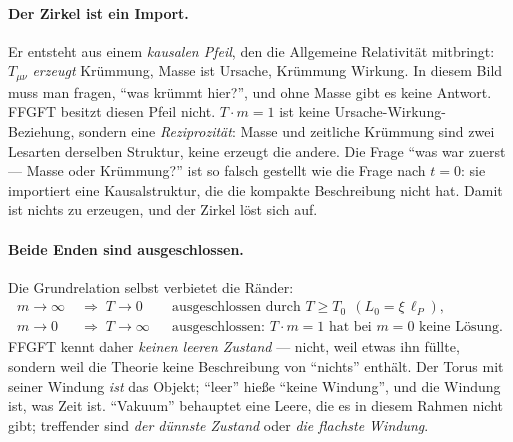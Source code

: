 \paragraph{Der Zirkel ist ein Import.} Er entsteht aus einem \emph{kausalen Pfeil}, den die
Allgemeine Relativität mitbringt: $T_{\mu\nu}$ \emph{erzeugt} Krümmung, Masse ist Ursache,
Krümmung Wirkung. In diesem Bild muss man fragen, \enquote{was krümmt hier?}, und ohne Masse gibt
es keine Antwort. FFGFT besitzt diesen Pfeil nicht. $T\cdot m = 1$ ist keine Ursache-Wirkung-
Beziehung, sondern eine \emph{Reziprozität}: Masse und zeitliche Krümmung sind zwei Lesarten
derselben Struktur, keine erzeugt die andere. Die Frage \enquote{was war zuerst --- Masse oder
Krümmung?} ist so falsch gestellt wie die Frage nach $t=0$: sie importiert eine Kausalstruktur,
die die kompakte Beschreibung nicht hat. Damit ist nichts zu erzeugen, und der Zirkel löst sich
auf.

\paragraph{Beide Enden sind ausgeschlossen.} Die Grundrelation selbst verbietet die Ränder:
\begin{align}
m \to \infty \;&\Rightarrow\; T \to 0 && \text{ausgeschlossen durch } T \ge T_0 \ \ (L_0 = \xi\,\ell_P),\\
m \to 0 \;&\Rightarrow\; T \to \infty && \text{ausgeschlossen: } T\cdot m = 1 \text{ hat bei } m=0 \text{ keine Lösung.}
\end{align}
FFGFT kennt daher \emph{keinen leeren Zustand} --- nicht, weil etwas ihn füllte, sondern weil die
Theorie keine Beschreibung von \enquote{nichts} enthält. Der Torus mit seiner Windung \emph{ist}
das Objekt; \enquote{leer} hieße \enquote{keine Windung}, und die Windung ist, was Zeit ist.
\enquote{Vakuum} behauptet eine Leere, die es in diesem Rahmen nicht gibt; treffender sind
\emph{der dünnste Zustand} oder \emph{die flachste Windung}.

